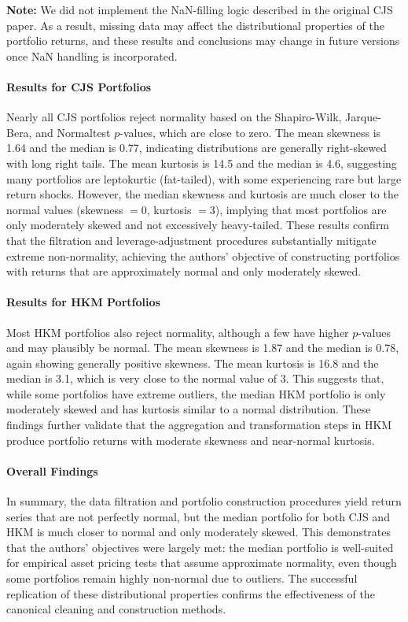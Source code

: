 \documentclass{article}
\begin{document}
\begin{appendices}
\textbf{Note:} We did not implement the NaN-filling logic described in the original CJS paper. As a result, missing data may affect the distributional properties of the portfolio returns, and these results and conclusions may change in future versions once NaN handling is incorporated.

\paragraph{Results for CJS Portfolios}

Nearly all CJS portfolios reject normality based on the Shapiro-Wilk, Jarque-Bera, and Normaltest $p$-values, which are close to zero. The mean skewness is 1.64 and the median is 0.77, indicating distributions are generally right-skewed with long right tails. The mean kurtosis is 14.5 and the median is 4.6, suggesting many portfolios are leptokurtic (fat-tailed), with some experiencing rare but large return shocks. However, the median skewness and kurtosis are much closer to the normal values (skewness $=0$, kurtosis $=3$), implying that most portfolios are only moderately skewed and not excessively heavy-tailed. These results confirm that the filtration and leverage-adjustment procedures substantially mitigate extreme non-normality, achieving the authors' objective of constructing portfolios with returns that are approximately normal and only moderately skewed.

\paragraph{Results for HKM Portfolios}
Most HKM portfolios also reject normality, although a few have higher $p$-values and may plausibly be normal. The mean skewness is 1.87 and the median is 0.78, again showing generally positive skewness. The mean kurtosis is 16.8 and the median is 3.1, which is very close to the normal value of 3. This suggests that, while some portfolios have extreme outliers, the median HKM portfolio is only moderately skewed and has kurtosis similar to a normal distribution. These findings further validate that the aggregation and transformation steps in HKM produce portfolio returns with moderate skewness and near-normal kurtosis.

\paragraph{Overall Findings}
In summary, the data filtration and portfolio construction procedures yield return series that are not perfectly normal, but the median portfolio for both CJS and HKM is much closer to normal and only moderately skewed. This demonstrates that the authors' objectives were largely met: the median portfolio is well-suited for empirical asset pricing tests that assume approximate normality, even though some portfolios remain highly non-normal due to outliers. The successful replication of these distributional properties confirms the effectiveness of the canonical cleaning and construction methods.




\end{appendices}
\end{document}
